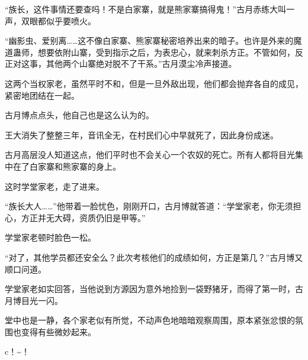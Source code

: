 \begin{this_body}
“族长，这件事情还要查吗！不是白家寨，就是熊家寨搞得鬼！”古月赤练大叫一声，双眼都似乎要喷火。

“幽影虫、爱别离……这不像白家寨、熊家寨秘密培养出来的暗子。也许是外来的魔道蛊师，想要依附山寨，受到指示之后，为表忠心，就来刺杀方正。不管如何，反正对这事，其他两个山寨绝对脱不了干系。”古月漠尘冷声接道。

这两个当权家老，虽然平时不和，但是一旦外敌出现，他们都会抛弃各自的成见，紧密地团结在一起。

古月博点点头，他自己也是这么认为的。

王大消失了整整三年，音讯全无，在村民们心中早就死了，因此身份成迷。

古月高层没人知道这点，他们平时也不会关心一个农奴的死亡。所有人都将目光集中在了白家寨和熊家寨的身上。

这时学堂家老，走了进来。

“族长大人……”他带着一脸忧色，刚刚开口，古月博就答道：“学堂家老，你无须担心，方正并无大碍，资质仍旧是甲等。”

学堂家老顿时脸色一松。

“对了，其他学员都还安全么？此次考核他们的成绩如何，方正是第几？”古月博又顺口问道。

学堂家老如实回答，当他说到方源因为意外地捡到一袋野猪牙，而得了第一时，古月博目光一闪。

堂中也是一静，各个家老似有所觉，不动声色地暗暗观察周围，原本紧张忿恨的氛围也变得有些微妙起来。

c！\~{}！

\end{this_body}

